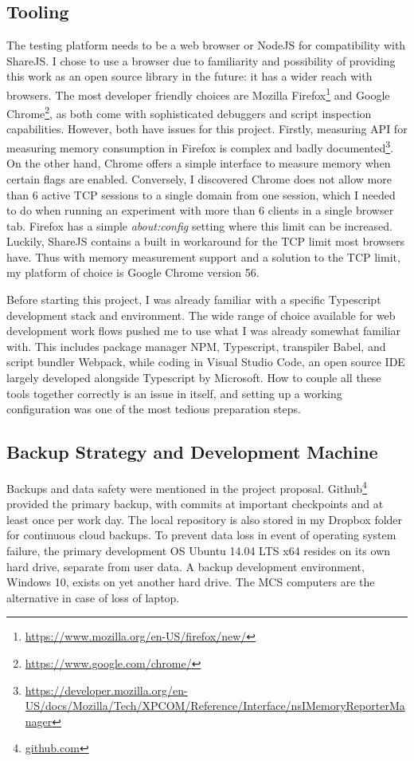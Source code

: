 \documentclass[12pt,a4paper,twoside,openright]{report}
\begin{document}
	\subsection{Tooling}
	The testing platform needs to be a web browser or NodeJS for compatibility with ShareJS. I chose to use a browser due to familiarity and possibility of providing this work as an open source library in the future: it has a wider reach with browsers. The most developer friendly choices are Mozilla Firefox\footnote{\url{https://www.mozilla.org/en-US/firefox/new/}} and Google Chrome\footnote{\url{https://www.google.com/chrome/}}, as both come with sophisticated debuggers and script inspection capabilities. However, both have issues for this project. Firstly, measuring API for measuring memory consumption in Firefox is complex and badly documented\footnote{\url{https://developer.mozilla.org/en-US/docs/Mozilla/Tech/XPCOM/Reference/Interface/nsIMemoryReporterManager}}. On the other hand, Chrome offers a simple interface to measure memory when certain flags are enabled. Conversely, I discovered Chrome does not allow more than 6 active TCP sessions to a single domain from one session, which I needed to do when running an experiment with more than 6 clients in a single browser tab. Firefox has a simple \textit{about:config} setting where this limit can be increased. Luckily, ShareJS contains a built in workaround for the TCP limit most browsers have. Thus with memory measurement support and a solution to the TCP limit, my platform of choice is Google Chrome version 56.
	
	Before starting this project, I was already familiar with a specific Typescript development stack and environment. The wide range of choice available for web development work flows pushed me to use what I was already somewhat familiar with. This includes package manager NPM, Typescript, transpiler Babel, and script bundler Webpack, while coding in Visual Studio Code, an open source IDE largely developed alongside Typescript by Microsoft. How to couple all these tools together correctly is an issue in itself, and setting up a working configuration was one of the most tedious preparation steps.
	
	\subsection{Backup Strategy and Development Machine}
	Backups and data safety were mentioned in the project proposal. Github\footnote{\url{github.com}} provided the primary backup, with commits at important checkpoints and at least once per work day. The local repository is also stored in my Dropbox folder for continuous cloud backups. To prevent data loss in event of operating system failure, the primary development OS Ubuntu 14.04 LTS x64 resides on its own hard drive, separate from user data. A backup development environment, Windows 10, exists on yet another hard drive. The MCS computers are the alternative in case of loss of laptop.
	
\end{document}
